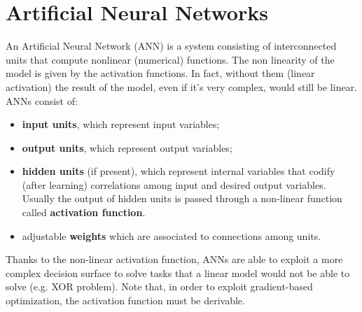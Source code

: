 \section{Artificial Neural Networks}
An Artificial Neural Network (ANN) is a system consisting of interconnected units that compute nonlinear (numerical) functions. The non linearity of the model is given by the activation functions. In fact, without them (linear activation) the result of the model, even if it’s very complex, would still be linear. ANNs consist of:
\begin{itemize}
    \item \textbf{input units}, which represent input variables;
    \item \textbf{output units}, which represent output variables;
    \item \textbf{hidden units} (if present), which represent internal variables that codify (after learning) correlations among input and desired output variables. Usually the output of hidden units is passed through a non-linear function called \textbf{activation function}. 
    \item adjustable \textbf{weights} which are associated to connections among units.
\end{itemize}
Thanks to the non-linear activation function, ANNs are able to exploit a more complex decision surface to solve tasks that a linear model would not be able to solve (e.g. XOR problem). Note that, in order to exploit gradient-based optimization, the activation function must be derivable.

